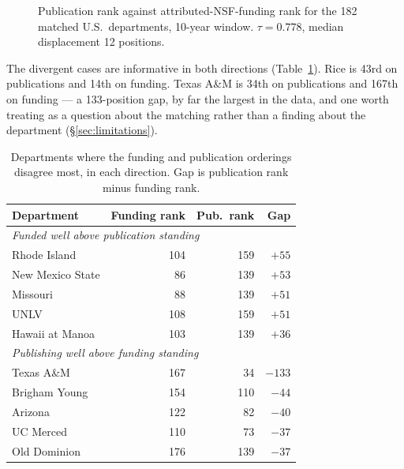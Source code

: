 \documentclass[11pt]{article}
\begin{document}
\begin{figure}[t]
\centering
{}
\caption{Publication rank against attributed-NSF-funding rank for the 182
matched U.S.\ departments, 10-year window. $\tau = 0.778$, median displacement
12 positions.}
\label{fig:funding}
\end{figure}

The divergent cases are informative in both directions
(Table~\ref{tab:nsfgap}). Rice is 43rd on publications and 14th on funding.
Texas A\&M is 34th on publications and 167th on funding --- a 133-position gap,
by far the largest in the data, and one worth treating as a question about the
matching rather than a finding about the department (\S\ref{sec:limitations}).

\begin{table}[t]
\centering
\caption{Departments where the funding and publication orderings disagree most,
in each direction. Gap is publication rank minus funding rank.}
\label{tab:nsfgap}
\begin{tabular}{lrrr}
\toprule
Department & Funding rank & Pub.\ rank & Gap \\
\midrule
\multicolumn{4}{l}{\emph{Funded well above publication standing}} \\
Rhode Island      & 104 & 159 & $+55$ \\
New Mexico State  & 86  & 139 & $+53$ \\
Missouri          & 88  & 139 & $+51$ \\
UNLV              & 108 & 159 & $+51$ \\
Hawaii at Manoa   & 103 & 139 & $+36$ \\
\midrule
\multicolumn{4}{l}{\emph{Publishing well above funding standing}} \\
Texas A\&M        & 167 & 34  & $-133$ \\
Brigham Young     & 154 & 110 & $-44$ \\
Arizona           & 122 & 82  & $-40$ \\
UC Merced         & 110 & 73  & $-37$ \\
Old Dominion      & 176 & 139 & $-37$ \\
\bottomrule
\end{tabular}
\end{table}
\end{document}
